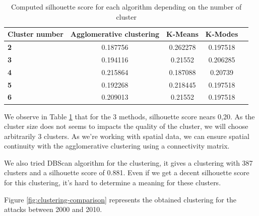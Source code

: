 \documentclass{article}
\begin{document}
\begin{table}[!htb]
    \centering
    \setlength{\tabcolsep}{12pt} %
    \renewcommand{\arraystretch}{1.5} %
    \begin{tabular}{>{\centering\bfseries}p{2cm}cccc}
        \toprule

        Cluster number & Agglomerative clustering & K-Means & K-Modes \\
        \midrule
        2        & 0.187756        & 0.262278        & 0.197518       \\
        3         & 	0.194116        & 0.21552        & 0.206285     \\
        4         & 0.215864        & 0.187088	       & 0.20739     \\
        5         & 0.192268        & 0.218445        & 0.197518     \\
        6         & 0.209013       & 0.21552        & 	0.197518     \\
        \bottomrule
    \end{tabular}
    \caption{Computed silhouette\cite{WikipediaSilhouette} score for each algorithm depending on the number of cluster}
    \label{tab:styled_table}
\end{table}


We observe in Table \ref{tab:styled_table} that for the 3 methods, silhouette score nears 0,20. As the cluster size does not seems to impacts the quality of the cluster, we will choose arbitrarily 3 clusters. As we're working with spatial data, we can ensure spatial continuity with the agglomerative clustering using a connectivity matrix.

We also tried DBScan algorithm for the clustering, it gives a clustering with 387 clusters and a silhouette score of 0.881. Even if we get a decent silhouette score for this clustering, it's hard to determine a meaning for these clusters.

Figure \ref{fig:clustering-comparison} represents the obtained clustering for the attacks between 2000 and 2010.
\end{document}
